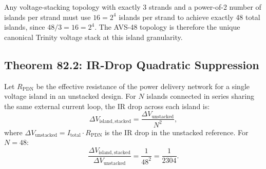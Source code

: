\begin{corollary}
\label{cor:canonical_trinity_stack}
Any voltage-stacking topology with exactly 3 strands and a power-of-2
number of islands per strand must use $16 = 2^4$ islands per strand to
achieve exactly 48 total islands, since $48/3 = 16 = 2^4$.  The
AVS-48 topology is therefore the unique canonical Trinity voltage stack
at this island granularity.
\end{corollary}

\subsection{Theorem 82.2: IR-Drop Quadratic Suppression}

\begin{theorem}
\label{thm:ir_drop_quadratic}
Let $R_\mathrm{PDN}$ be the effective resistance of the power delivery
network for a single voltage island in an unstacked design.  For $N$
islands connected in series sharing the same external current loop,
the IR drop across each island is:
\[
  \Delta V_\mathrm{island,stacked} = \frac{\Delta V_\mathrm{unstacked}}{N^2},
\]
where $\Delta V_\mathrm{unstacked} = I_\mathrm{total} \cdot R_\mathrm{PDN}$
is the IR drop in the unstacked reference.  For $N = 48$:
\[
  \frac{\Delta V_\mathrm{island,stacked}}{\Delta V_\mathrm{unstacked}}
  = \frac{1}{48^2} = \frac{1}{2304}.
\]
\end{theorem}

